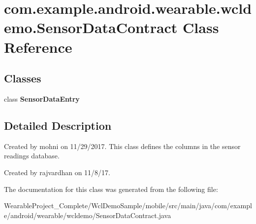 \hypertarget{classcom_1_1example_1_1android_1_1wearable_1_1wcldemo_1_1SensorDataContract}{}\section{com.\+example.\+android.\+wearable.\+wcldemo.\+Sensor\+Data\+Contract Class Reference}
\label{classcom_1_1example_1_1android_1_1wearable_1_1wcldemo_1_1SensorDataContract}
\subsection*{Classes}
\begin{DoxyCompactItemize}
\item 
class {\bfseries Sensor\+Data\+Entry}
\end{DoxyCompactItemize}


\subsection{Detailed Description}
Created by mohni on 11/29/2017. This class defines the columns in the sensor readings database.

Created by rajvardhan on 11/8/17. 

The documentation for this class was generated from the following file\+:\begin{DoxyCompactItemize}
\item 
Wearable\+Project\+\_\+\+Complete/\+Wcl\+Demo\+Sample/mobile/src/main/java/com/example/android/wearable/wcldemo/Sensor\+Data\+Contract.\+java\end{DoxyCompactItemize}
